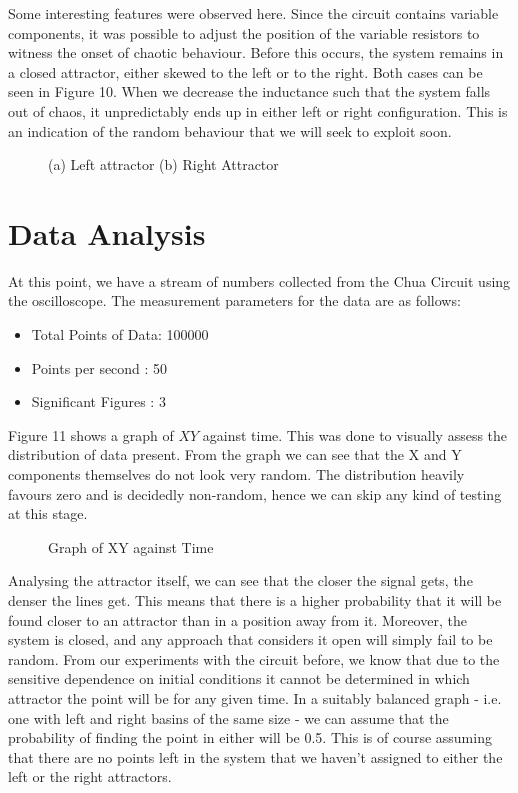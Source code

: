 \documentclass[jou,apacite]{apa6}
\begin{document}
Some interesting features were observed here. Since the circuit contains variable components, it was possible to adjust the position of the variable resistors to witness the onset of chaotic behaviour. Before this occurs, the system remains in a closed attractor, either skewed to the left or to the right. Both cases can be seen in Figure 10. When we decrease the inductance such that the system falls out of chaos, it unpredictably ends up in either left or right configuration. This is an indication of the random behaviour that we will seek to exploit soon.

\begin{figure}[H]
\caption{(a) Left attractor (b) Right Attractor}
\endminipage\hfill
{}
\endminipage
\end{figure}

\section{Data Analysis}

At this point, we have a stream of numbers collected from the Chua Circuit using the oscilloscope. The measurement parameters for the data are as follows:

\begin{itemize}
\item Total Points of Data: 100000
\item Points per second : 50
\item Significant Figures : 3
\end{itemize}

Figure 11 shows a graph of $XY$ against time. This was done to visually assess the distribution of data present. From the graph we can see that the X and Y components themselves do not look very random. The distribution heavily favours zero and is decidedly non-random, hence we can skip any kind of testing at this stage.

\begin{figure}[H]
\caption{Graph of XY against Time}
\end{figure}

Analysing the attractor itself, we can see that the closer the signal gets, the denser the lines get. This means that there is a higher probability that it will be found closer to an attractor than in a position away from it. Moreover, the system is closed, and any approach that considers it open will simply fail to be random. From our experiments with the circuit before, we know that due to the sensitive dependence on initial conditions it cannot be determined in which attractor the point will be for any given time. In a suitably balanced graph - i.e. one with left and right basins of the same size - we can assume that the probability of finding the point in either will be 0.5. This is of course assuming that there are no points left in the system that we haven't assigned to either the left or the right attractors. 
\end{document}
